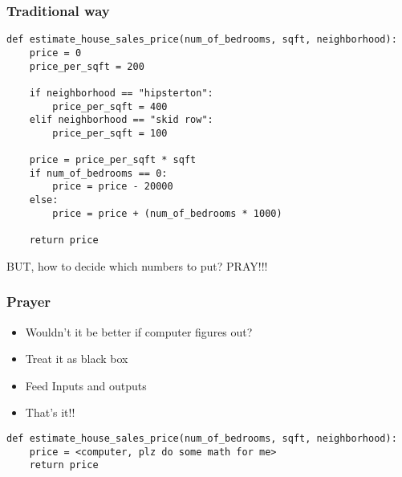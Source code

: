 %
%
%
%

\begin{frame}[fragile]\frametitle{Traditional way}
\begin{lstlisting}
def estimate_house_sales_price(num_of_bedrooms, sqft, neighborhood):
	price = 0
	price_per_sqft = 200

 	if neighborhood == "hipsterton": 
 		price_per_sqft = 400
	elif neighborhood == "skid row": 
		price_per_sqft = 100
	
	price = price_per_sqft * sqft
	if num_of_bedrooms == 0: 
		price = price - 20000
	else: 
		price = price + (num_of_bedrooms * 1000)
    
	return price
\end{lstlisting}
BUT, how to decide which numbers to put? PRAY!!!
\end{frame}

\begin{frame}[fragile]\frametitle{Prayer}
	\begin{itemize}
	\item Wouldn't it be better if computer figures out? 
	\item Treat it as black box
	\item Feed Inputs and outputs
	\item That's it!!
	\end{itemize}
\begin{lstlisting}
def estimate_house_sales_price(num_of_bedrooms, sqft, neighborhood):
    price = <computer, plz do some math for me>
    return price
\end{lstlisting}
\end{frame}


